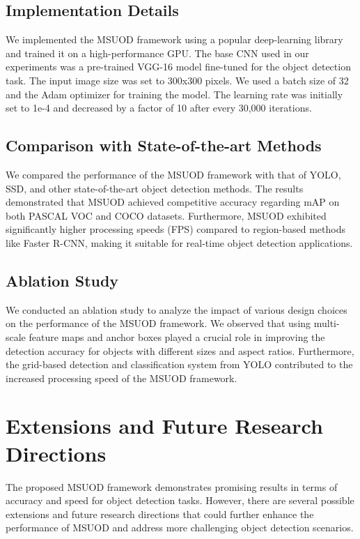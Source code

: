 \documentclass[conference]{IEEEtran}
\begin{document}
\begin{itemize}
\subsection{Implementation Details}

We implemented the MSUOD framework using a popular deep-learning library and trained it on a high-performance GPU. The base CNN used in our experiments was a pre-trained VGG-16 model fine-tuned for the object detection task. The input image size was set to 300x300 pixels. We used a batch size of 32 and the Adam optimizer for training the model. The learning rate was initially set to 1e-4 and decreased by a factor of 10 after every 30,000 iterations.

\subsection{Comparison with State-of-the-art Methods}

We compared the performance of the MSUOD framework with that of YOLO, SSD, and other state-of-the-art object detection methods. The results demonstrated that MSUOD achieved competitive accuracy regarding mAP on both PASCAL VOC and COCO datasets. Furthermore, MSUOD exhibited significantly higher processing speeds (FPS) compared to region-based methods like Faster R-CNN, making it suitable for real-time object detection applications.

\subsection{Ablation Study}

We conducted an ablation study to analyze the impact of various design choices on the performance of the MSUOD framework. We observed that using multi-scale feature maps and anchor boxes played a crucial role in improving the detection accuracy for objects with different sizes and aspect ratios. Furthermore, the grid-based detection and classification system from YOLO contributed to the increased processing speed of the MSUOD framework.

\section{Extensions and Future Research Directions}

The proposed MSUOD framework demonstrates promising results in terms of accuracy and speed for object detection tasks. However, there are several possible extensions and future research directions that could further enhance the performance of MSUOD and address more challenging object detection scenarios.


\end{itemize}
\end{document}
